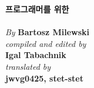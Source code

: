 

\thispagestyle{empty}

\vspace*{80pt}

\begin{raggedleft}
\fontsize{24pt}{24pt}\selectfont
\textbf{프로그래머를 위한 \\ \trCategoryTheory}\\
\ifdefined{}
\fi
\vspace*{1cm}
\fontsize{16pt}{18pt}\selectfont \textit{By } \textbf{Bartosz Milewski}\\
\vspace{1cm}
\fontsize{12pt}{14pt}\selectfont \textit{compiled and edited by}\\ \textbf{Igal Tabachnik}\\
\vspace{1cm}
\fontsize{12pt}{14pt}\selectfont \textit{translated by}\\ \textbf{jwvg0425, stet-stet}\\

\end{raggedleft}


\newpage

\vspace*{0.3\textheight}
\thispagestyle{empty}

